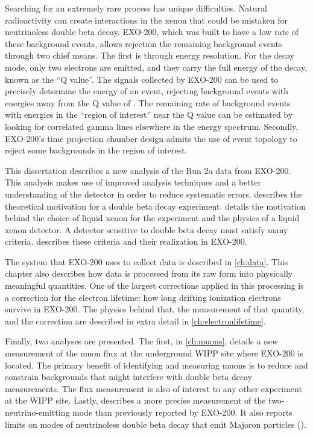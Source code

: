 \documentclass[herrin-thesis.tex]{subfiles}
\begin{document}
Searching for an extremely rare process has unique difficulties. Natural radioactivity can create interactions in the xenon that could be mistaken for neutrinoless double beta decay. EXO-200, which was built to have a low rate of these background events, allows rejection the remaining background events through two chief means. The first is through energy resolution. For the \zeronu{} decay mode, only two electrons are emitted, and they carry the full energy of the decay, known as the ``Q value''. The signals collected by EXO-200 can be used to precisely determine the energy of an event, rejecting background events with energies away from the Q value of . The remaining rate of background events with energies in the ``region of interest'' near the Q value can be estimated by looking for correlated gamma lines elsewhere in the energy spectrum. Secondly, EXO-200's time projection chamber design admits the use of event topology to reject some backgrounds in the region of interest.

This dissertation describes a new analysis of the Run 2a data from EXO-200. This analysis makes use of improved analysis techniques and a better understanding of the detector in order to reduce systematic errors.  describes the theoretical motivation for a double beta decay experiment.  details the motivation behind the choice of liquid xenon for the experiment and the physics of a liquid xenon detector. A detector sensitive to double beta decay must satisfy many criteria.  describes these criteria and their realization in EXO-200.

The system that EXO-200 uses to collect data is described in \cref{ch:data}. This chapter also describes how data is processed from its raw form into physically meaningful quantities. One of the largest corrections applied in this processing is a correction for the electron lifetime: how long drifting ionization electrons survive in EXO-200. The physics behind that, the measurement of that quantity, and the correction are described in extra detail in \cref{ch:electronlifetime}.

Finally, two analyses are presented. The first, in \cref{ch:muons}, details a new measurement of the muon flux at the underground WIPP site where EXO-200 is located. The primary benefit of identifying and measuring muons is to reduce and constrain backgrounds that might interfere with double beta decay measurements. The flux measurement is also of interest to any other experiment at the WIPP site. Lastly,  describes a more precise measurement of the two-neutrino-emitting mode than previously reported by EXO-200. It also reports limits on modes of neutrinoless double beta decay that emit Majoron particles (\zeronuXpX{}).
\end{document}
